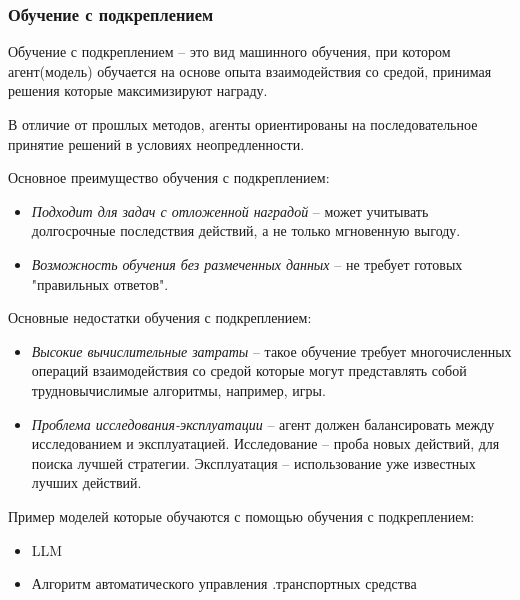 \documentclass[../part_1.tex]{subfiles}
\begin{document}
\subsubsection{Обучение с подкреплением} %
    \label{sec:reinforcement_learning}
    \par Обучение с подкреплением --  это вид машинного обучения, при котором агент(модель) обучается на основе опыта взаимодействия со средой, принимая решения которые максимизируют награду.
    \par В отличие от прошлых методов, агенты ориентированы на последовательное принятие решений в условиях неопредленности.
    
    \par Основное преимущество обучения с подкреплением:
    \begin{itemize}
        \item \textit{Подходит для задач с отложенной наградой} -- может учитывать долгосрочные последствия действий, а не только мгновенную выгоду.
        \item \textit{Возможность обучения без размеченных данных} -- не требует готовых "правильных ответов".
    \end{itemize}
    \par Основные недостатки обучения с подкреплением:
    \begin{itemize}
        \item \textit{Высокие вычислительные затраты} -- такое обучение требует многочисленных операций взаимодействия со средой которые могут представлять собой трудновычислимые алгоритмы, например, игры.
        \item \textit{Проблема исследования-эксплуатации} -- агент должен балансировать между исследованием и эксплуатацией. Исследование -- проба новых действий, для поиска лучшей стратегии. Эксплуатация -- использование уже известных лучших действий.
    \end{itemize}
    \par Пример моделей которые обучаются с помощью обучения с подкреплением:
    \begin{itemize}
        \item LLM
        \item Алгоритм автоматического управления .транспортных средства
    \end{itemize}
\end{document}
